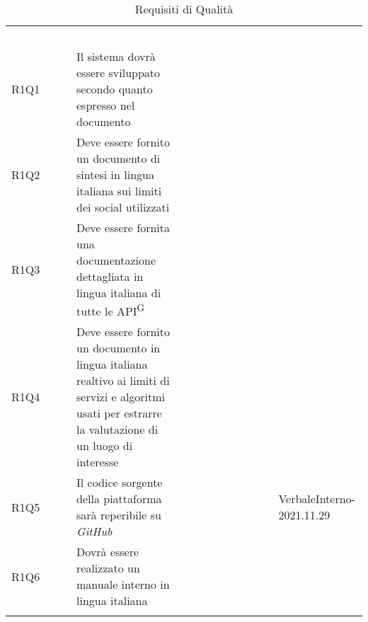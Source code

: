 

\renewcommand{\arraystretch}{1.5}
\begin{longtable}{ m{}<{\centering}  m{}<{\centering}  m{}<{\centering}  m{}<{\centering}}
	\rowcolor{darkblue}
	\textcolor{white}{\textbf{Requisito}} &\textcolor{white}{\textbf{Descrizione}}& \textcolor{white}{\textbf{Classificazione}} & \textcolor{white}{\textbf{Fonti}}\\ 

	R1Q1 & Il sistema dovrà essere sviluppato secondo quanto espresso nel documento \textit{\NdP} & \Ob & \Di \\
	
	R1Q2 & Deve essere fornito un documento di sintesi in lingua italiana sui limiti dei social utilizzati & \Ob & \Ca \\
	
	R1Q3 & Deve essere fornita una documentazione dettagliata in lingua italiana di tutte le API\textsuperscript{G} & \Ob & \Ca \\

	R1Q4 & Deve essere fornito un documento in lingua italiana realtivo ai limiti di servizi e algoritmi usati per estrarre la valutazione di un luogo di interesse & \Ob & \Ca \\

	R1Q5 & Il codice sorgente della piattaforma sarà reperibile su \textit{GitHub} & \Ob & VerbaleInterno-2021.11.29 \\
	
	R1Q6 & Dovrà essere realizzato un manuale interno in lingua italiana  & \Ob & \Di \\

	\hiderowcolors \caption{Requisiti di Qualità}
\end{longtable}

\clearpage